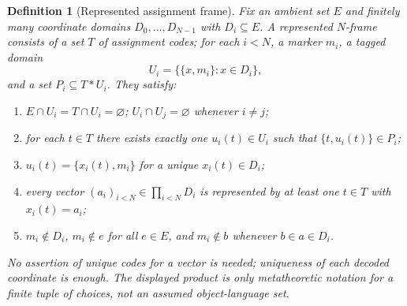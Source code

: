 \documentclass[11pt,a4paper]{article}
\numberwithin{equation}{section}
\newtheorem{definition}[theorem]{Definition}
\newcommand{\up}[2]{\{#1,#2\}}
\newcommand{\UnProd}{\mathbin{\ast}}
\begin{document}
\begin{definition}[Represented assignment frame]\label{def:frame}
Fix an ambient set $E$ and finitely many coordinate domains $D_0,\ldots,D_{N-1}$ with $D_i\subseteq E$.  A \emph{represented $N$-frame} consists of a set $T$ of assignment codes; for each $i<N$, a marker $m_i$, a tagged domain
\[
U_i=\{\up x{m_i}:x\in D_i\},
\]
and a set $P_i\subseteq T\UnProd U_i$.  They satisfy:
\begin{enumerate}[label=(F\arabic*),leftmargin=3em,itemsep=2pt]
\item $E\cap U_i=T\cap U_i=\varnothing$; $U_i\cap U_j=\varnothing$ whenever $i\ne j$;
\item for each $t\in T$ there exists exactly one $u_i(t)\in U_i$ such that $\up t{u_i(t)}\in P_i$;
\item $u_i(t)=\up{x_i(t)}{m_i}$ for a unique $x_i(t)\in D_i$;
\item every vector $(a_i)_{i<N}\in\prod_{i<N}D_i$ is represented by at least one $t\in T$ with $x_i(t)=a_i$;
\item $m_i\notin D_i$, $m_i\notin e$ for all $e\in E$, and $m_i\notin b$ whenever $b\in a\in D_i$.
\end{enumerate}
No assertion of unique codes for a vector is needed; uniqueness of each \emph{decoded coordinate} is enough.  The displayed product is only metatheoretic notation for a finite tuple of choices, not an assumed object-language set.
\end{definition}
\end{document}
